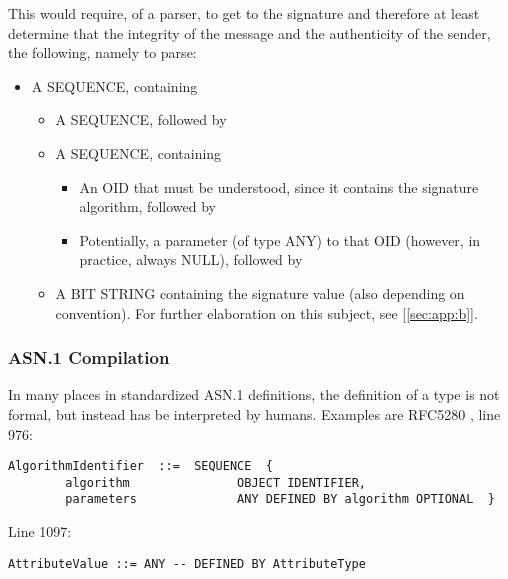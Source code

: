 This would require, of a parser, to get to the signature and therefore at 
least determine that the integrity of the message and the authenticity of 
the sender, the following, namely to parse:
\begin{itemize}
    \item A SEQUENCE, containing
    \begin{itemize}
        \item A SEQUENCE, followed by
        \item A SEQUENCE, containing
        \begin{itemize}
            \item An OID that must be understood, since it contains the 
signature algorithm, followed by
            \item Potentially, a parameter (of type ANY) to that OID 
(however, in practice, always NULL), followed by
        \end{itemize}
        \item A BIT STRING containing the signature value (also depending on 
convention).
For further elaboration on this subject, see [\ref{sec:app:b}].
    \end{itemize}
\end{itemize}

\subsubsection{ASN.1 Compilation}


In many places in standardized ASN.1 definitions, the definition of a type 
is not formal, but instead has be interpreted by humans. Examples are 
RFC5280 \cite{bib:cert}, line 976:

\begin{changemargin}{-60mm}{0mm}
\begin{myquote}
\begin{verbatim}
AlgorithmIdentifier  ::=  SEQUENCE  {
        algorithm               OBJECT IDENTIFIER,
        parameters              ANY DEFINED BY algorithm OPTIONAL  }
\end{verbatim}
\end{myquote}
\end{changemargin}

Line 1097:

\begin{changemargin}{-60mm}{0mm}
\begin{myquote}
\begin{verbatim}
AttributeValue ::= ANY -- DEFINED BY AttributeType
\end{verbatim}
\end{myquote}
\end{changemargin}

